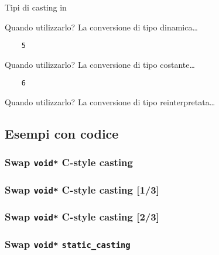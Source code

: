 \documentclass[xcolor={dvipsnames, svgnames, x11names, table}, 10pt]{beamer}
\begin{document}
\begin{frame}[t, fragile]{Tipi di casting in \cplusplus}
\begin{overprint}
    \begin{block}{Quando utilizzarlo?}
    La conversione di tipo dinamica\dots
    \end{block}
    
    \begin{verbatim}
    5
    \end{verbatim}
        
    \begin{block}{Quando utilizzarlo?}
    La conversione di tipo costante\dots
    \end{block}
    
    \begin{verbatim}
    6
    \end{verbatim}
    
    \begin{block}{Quando utilizzarlo?}
    La conversione di tipo reinterpretata\dots
    \end{block}
    \end{overprint}
    
\end{frame}

\subsection{Esempi con codice}

\subsubsection{Swap \texttt{void*} C-style casting}

\begin{frame}[t, fragile]

    \frametitle<1>{Swap \texttt{void*} C-style casting [1/3]}
    
    \frametitle<2>{Swap \texttt{void*} C-style casting [2/3]}

\end{frame}

\subsubsection{Swap \texttt{void*} \texttt{static\_casting}}
\end{document}
